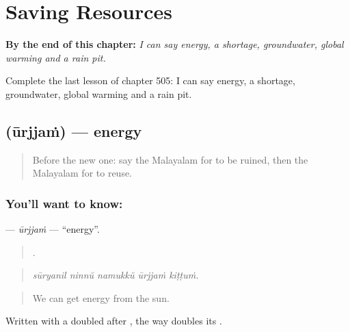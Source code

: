 
\chapter{Saving Resources}
\label{ch:ml-saving-resources}

\begin{chapteropening}
\textbf{By the end of this chapter:} \emph{I can say energy, a shortage, groundwater, global warming and a rain pit.}

Complete the last lesson of chapter 505: I can say energy, a shortage, groundwater, global warming and a rain pit.
\end{chapteropening}

\section[\texorpdfstring{\ml{ഊർജ്ജം} (ūrjjaṁ)}{ഊർജ്ജം (ūrjjaṁ)}]{ (ūrjjaṁ) — energy}

\label{lesson:ML-C505-urjjam}



\begin{quote}
Before the new one: say the Malayalam for to be ruined, then the Malayalam for to reuse.
\end{quote}

\subsection*{You'll want to know: }
\textbf{} — \emph{ūrjjaṁ} — \textquotedblleft{}energy\textquotedblright{}.

\begin{quote}
    .
\end{quote}

\begin{quote}
\emph{sūryanil ninnŭ namukkŭ ūrjjaṁ kiṭṭuṁ.}
\end{quote}

\begin{quote}
We can get energy from the sun.
\end{quote}

Written with a doubled  after , the way  doubles its .

